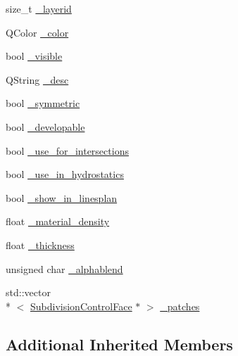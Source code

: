 \begin{DoxyCompactItemize}
\item 
size\-\_\-t \hyperlink{classShipCADGeometry_1_1SubdivisionLayer_a8c13850079e9af7429f410e8c74699b8}{\-\_\-layerid}
\item 
Q\-Color \hyperlink{classShipCADGeometry_1_1SubdivisionLayer_a761c7aba109a7b6804d38394afcecd43}{\-\_\-color}
\item 
bool \hyperlink{classShipCADGeometry_1_1SubdivisionLayer_aaf8127c4c895e6fb13d2281ae2e5e5ff}{\-\_\-visible}
\item 
Q\-String \hyperlink{classShipCADGeometry_1_1SubdivisionLayer_a6a3e5be6a7582173e1d21c1b602fcdf3}{\-\_\-desc}
\item 
bool \hyperlink{classShipCADGeometry_1_1SubdivisionLayer_aff0dc8cd1738cf77e4d9f21e32e1e871}{\-\_\-symmetric}
\item 
bool \hyperlink{classShipCADGeometry_1_1SubdivisionLayer_a345debb0ab6c8cb47390e26b42db6c19}{\-\_\-developable}
\item 
bool \hyperlink{classShipCADGeometry_1_1SubdivisionLayer_a569c2fceb937af23e69f824a98194738}{\-\_\-use\-\_\-for\-\_\-intersections}
\item 
bool \hyperlink{classShipCADGeometry_1_1SubdivisionLayer_a3936e3f018cf47ab79df20b83aaddb07}{\-\_\-use\-\_\-in\-\_\-hydrostatics}
\item 
bool \hyperlink{classShipCADGeometry_1_1SubdivisionLayer_afcd5fafc70f5c2ab0daf579c55f36dc5}{\-\_\-show\-\_\-in\-\_\-linesplan}
\item 
float \hyperlink{classShipCADGeometry_1_1SubdivisionLayer_ac68f5ccf5f32d072ba54d1000e1fb5d3}{\-\_\-material\-\_\-density}
\item 
float \hyperlink{classShipCADGeometry_1_1SubdivisionLayer_a4bdebcd4814a97931dad6865caee0554}{\-\_\-thickness}
\item 
unsigned char \hyperlink{classShipCADGeometry_1_1SubdivisionLayer_a9797f92ac85b0e981ce8c78bd104c112}{\-\_\-alphablend}
\item 
std\-::vector\\*
$<$ \hyperlink{classShipCADGeometry_1_1SubdivisionControlFace}{Subdivision\-Control\-Face} $\ast$ $>$ \hyperlink{classShipCADGeometry_1_1SubdivisionLayer_ae352b98eddb1f238a61f91417f9649dd}{\-\_\-patches}
\end{DoxyCompactItemize}
\subsection*{Additional Inherited Members}


